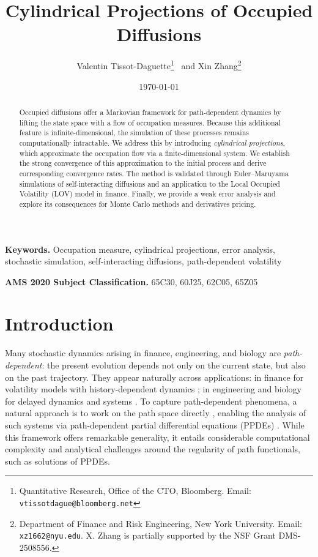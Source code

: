 \documentclass[11pt]{article}
\title{\vspace{-10mm}
Cylindrical Projections of Occupied Diffusions 
\vspace{-3mm}}
\date{\today}
\author{Valentin Tissot-Daguette\thanks{Quantitative Research, Office of the  CTO, Bloomberg. Email: \texttt{vtissotdague@bloomberg.net}} \,  and Xin Zhang\thanks{Department of Finance and Risk Engineering, New York University.  Email: {\tt xz1662@nyu.edu}. X. Zhang is partially supported by the NSF Grant DMS-2508556.}}
\numberwithin{equation}{section}
\theoremstyle{plain}
\theoremstyle{definition}
\begin{document}
\maketitle

\begin{abstract}
Occupied diffusions offer a Markovian framework for path-dependent dynamics by lifting  the state space with a flow of occupation measures. Because this additional feature is  infinite-dimensional, the simulation of these processes  remains computationally intractable. We address this by introducing \emph{cylindrical projections}, which approximate the  occupation flow via a  finite-dimensional system. We establish the strong convergence of this approximation to the initial process and derive corresponding convergence rates. The method is validated through Euler--Maruyama simulations of self-interacting  diffusions and an application to the Local Occupied Volatility (LOV) model in finance. 
Finally, we  provide a weak error analysis and explore its consequences for Monte Carlo methods and derivatives pricing.
\end{abstract}


{\small
\noindent\textbf{Keywords.} Occupation measure, cylindrical projections, error analysis, stochastic simulation, self-interacting diffusions, path-dependent volatility}

\vspace{3mm}

\noindent\textbf{AMS 2020 Subject Classification.} 
65C30, %
60J25,  %
62C05, %
65Z05 %


%
\section{Introduction}

Many stochastic dynamics arising in finance, engineering, and biology  are
\emph{path-dependent}: the present evolution depends not only on the current state, but also on the past trajectory. They appear naturally across applications: in finance for volatility models with history-dependent dynamics \cite{GrasselliPages,Guyon2014,GuyonSlides,GuyonLekeufack}; in engineering and biology for delayed dynamics and systems \cite{GSBOM16,WWQ16}. To capture  path-dependent phenomena, a natural approach  is to work on the path space directly  \cite{Dupire19}, enabling the analysis of such systems via path-dependent partial differential equations (PPDEs)   \cite{EKTZ14,ETZ16}. While this framework offers remarkable generality, it entails considerable computational complexity and analytical challenges around the regularity of path functionals, such as solutions of PPDEs.
\end{document}
